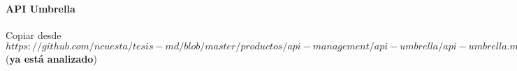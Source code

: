 \paragraph{API Umbrella}

Copiar desde $https://github.com/ncuesta/tesis-md/blob/master/productos/api-management/api-umbrella/api-umbrella.md$ (\textbf{ya está analizado})
